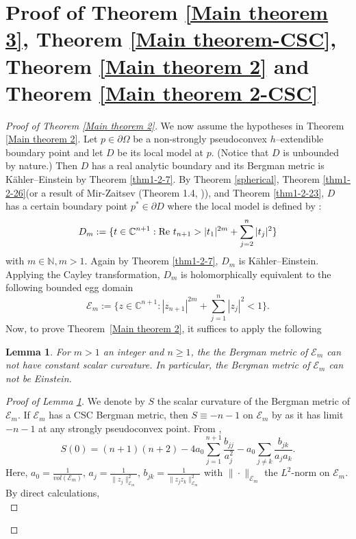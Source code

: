 \documentclass[a4paper,centertags,oneside,12pt]{amsart}
\newcommand{\p}{\partial}
\newtheorem{lemma}[theorem]{Lemma}
\numberwithin{equation}{section}
\begin{document}
\section{Proof of Theorem \ref{Main theorem 3},  Theorem \ref{Main theorem-CSC}, Theorem \ref{Main theorem 2} and Theorem \ref{Main theorem 2-CSC}}
\begin{proof}[Proof of Theorem \ref{Main theorem 2}]
We now assume the hypotheses  in Theorem \ref{Main theorem 2}. Let $p\in \p\Omega$ be a non-strongly pseudoconvex $h$--extendible boundary point and let $D$ be  its local model at $p$. (Notice that $D$ is unbounded by nature.) Then $D$ has a real analytic boundary and its Bergman metric is  K\"ahler--Einstein by  Theorem \ref{thm1-2-7}.  By Theorem \ref{spherical}, 
Theorem \ref{thm1-2-26}(or a result of Mir-Zaitsev (Theorem 1.4, \cite{MZ21})), and  Theorem \ref{thm1-2-23}, $D$ has  a certain  boundary point $p^\ast\in\partial D$ where the local model is  defined by  :
$$D_m:=\{t\in\mathbb C^{n+1}: {\rm Re}~t_{n+1}>|t_1|^{2m}+\sum_{j=2}^{n}|t_j|^2\}$$  with $m\in\mathbb N, m>1$.
Again by Theorem  \ref{thm1-2-7}, $D_m$ is  K\"ahler--Einstein.
Applying the Cayley transformation, $D_m$ is holomorphically equivalent to the following bounded egg domain
$$\mathcal E_m:=\{z\in\mathbb C^{n+1}:|z_{n+1}|^{2m}+\sum_{j=1}^{n}|z_j|^2<1\}.$$
Now, to prove Theorem~\ref{Main theorem 2}, it suffices to apply the following 
\begin{lemma}\label{example}
    For $m>1$ an integer  and $n\geq 1$, the the Bergman metric of $\mathcal E_m$ can not have constant scalar curvature. In particular, the Bergman metric of $\mathcal E_m$ can not be Einstein.
\end{lemma}
\begin{proof}[Proof of  Lemma \ref{example}]
    We denote by  $S$  the scalar curvature of the Bergman metric of $\mathcal E_m$. If $\mathcal E_m$ has a CSC Bergman metric, then $S\equiv -n-1$ on $\mathcal E_m$ by \cite[Corollary 2]{KYu96} as it has limit $-n-1$ at any strongly pseudoconvex point. From \cite {KYu96}, 
    \begin{equation}\label{scalar}
    S(0)=(n+1)(n+2)-4a_0\sum_{j=1}^{n+1}\frac{b_{jj}}{a_j^2}-a_0\sum_{j\neq k}\frac{b_{jk}}{a_ja_k}.
    \end{equation}
    Here, $a_0=\frac{1}{vol(\mathcal E_m)}$, $a_j=\frac{1}{\|z_j\|_{\mathcal E_m}^2}$, $b_{jk}=\frac{1}{\|z_jz_k\|^2_{\mathcal E_m}}$ with $\|\cdot\|_{\mathcal E_m}$ the $L^2$-norm on $\mathcal E_m$.
    By direct calculations, 
    \begin{equation}\label{5-28-a1}

\end{equation}
\end{proof}
\end{proof}
\end{document}
